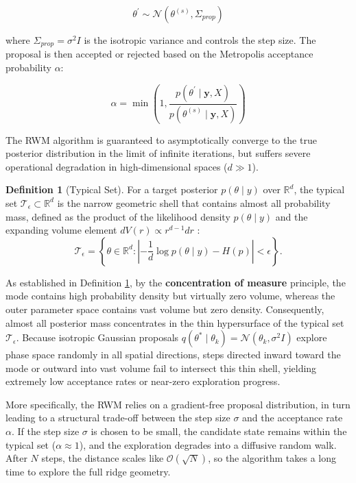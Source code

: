 \documentclass[12pt,oneside]{report}
\theoremstyle{definition}
\newtheorem{definition}[theorem]{Definition}
\theoremstyle{remark}
\begin{document}
$$\theta^\prime \sim \mathcal{N}(\theta^{(s)}, \Sigma_{prop})$$


where $\Sigma_{prop} = \sigma^2 I$ is the isotropic variance and controls the step size. The proposal is then accepted or rejected based on the Metropolis acceptance probability $\alpha$:

$$\alpha = \min\left(1, \frac{p(\theta^\prime \mid \mathbf{y}, X)}{p(\theta^{(s)} \mid \mathbf{y}, X)}\right)$$

The RWM algorithm is guaranteed to asymptotically converge to the true posterior distribution in the limit of infinite iterations, but suffers severe operational degradation in high-dimensional spaces ($d \gg 1$). 

\begin{definition}[Typical Set]
\label{def:typical_set}
For a target posterior $p(\theta \mid y)$ over $\mathbb{R}^d$, the typical set $\mathcal{T}_\epsilon \subset \mathbb{R}^d$ is the narrow geometric shell that contains almost all probability mass, defined as the product of the likelihood density $p(\theta \mid y)$ and the expanding volume element $dV(r) \propto r^{d-1}dr$ \citep{betancourt2017conceptual}:
\begin{equation}
\mathcal{T}_\epsilon = \left\{ \theta \in \mathbb{R}^d : \left| -\frac{1}{d}\log p(\theta \mid y) - H(p) \right| < \epsilon \right\}.
\end{equation}
\end{definition}

As established in Definition \ref{def:typical_set}, by the \textbf{concentration of measure} principle, the mode contains high probability density but virtually zero volume, whereas the outer parameter space contains vast volume but zero density. Consequently, almost all posterior mass concentrates in the thin hypersurface of the typical set $\mathcal{T}_\epsilon$. Because isotropic Gaussian proposals $q(\theta^* \mid \theta_k) = \mathcal{N}(\theta_k, \sigma^2 I)$ explore phase space randomly in all spatial directions, steps directed inward toward the mode or outward into vast volume fail to intersect this thin shell, yielding extremely low acceptance rates or near-zero exploration progress.

More specifically, the RWM relies on a gradient-free proposal distribution, in turn leading to a structural trade-off between the step size $\sigma$ and the acceptance rate $\alpha$. If the step size $\sigma$ is chosen to be small, the candidate state remains within the typical set ($\alpha \approx 1$), and the exploration degrades into a diffusive random walk. After $N$ steps, the distance scales like $\mathcal{O}(\sqrt{N})$, so the algorithm takes a long time to explore the full ridge geometry.
\end{document}
